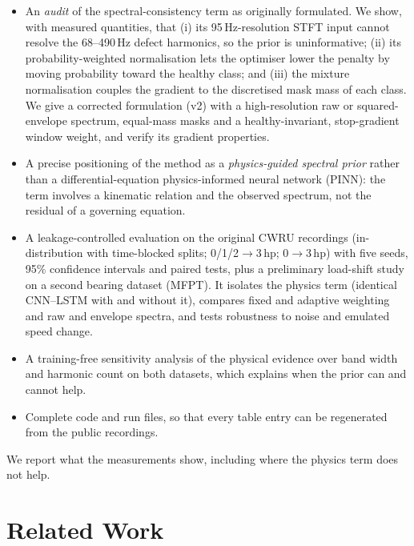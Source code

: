 \documentclass[conference]{IEEEtran}
\begin{document}
\begin{itemize}
\item An \emph{audit} of the spectral-consistency term as originally formulated.
We show, with measured quantities, that (i) its 95\,Hz-resolution STFT input
cannot resolve the 68--490\,Hz defect harmonics, so the prior is uninformative;
(ii) its probability-weighted normalisation lets the optimiser lower the
penalty by moving probability toward the healthy class; and (iii) the mixture
normalisation couples the gradient to the discretised mask mass of each class.
We give a corrected formulation (v2) with a high-resolution raw or
squared-envelope spectrum, equal-mass masks and a healthy-invariant,
stop-gradient window weight, and verify its gradient properties.
\item A precise positioning of the method as a \emph{physics-guided spectral
prior} rather than a differential-equation physics-informed neural network
(PINN): the term involves a kinematic relation and the observed spectrum, not
the residual of a governing equation.
\item A leakage-controlled evaluation on the original CWRU recordings
(in-distribution with time-blocked splits; 0/1/2$\to$3\,hp; 0$\to$3\,hp) with
five seeds, 95\% confidence intervals and paired tests, plus a preliminary
load-shift study on a second bearing dataset (MFPT). It isolates the physics term (identical CNN--LSTM with and without
it), compares fixed and adaptive weighting and raw and envelope spectra, and
tests robustness to noise and emulated speed change.
\item A training-free sensitivity analysis of the physical evidence over band
width and harmonic count on both datasets, which explains when the prior can
and cannot help.
\item Complete code and run files, so that every table entry can be regenerated
from the public recordings.
\end{itemize}

We report what the measurements show, including where the physics term does
not help.

\section{Related Work}
\end{document}
